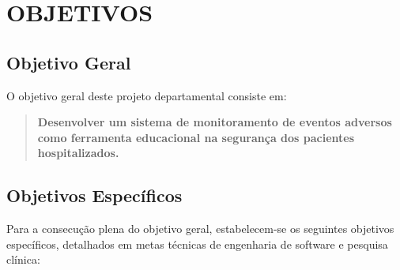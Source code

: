 \chapter{OBJETIVOS}
\label{cap:objetivos}

\section{Objetivo Geral}
\label{sec:objetivo-geral}

O objetivo geral deste projeto departamental consiste em:

\begin{quote}
\textbf{Desenvolver um sistema de monitoramento de eventos adversos como ferramenta educacional na segurança dos pacientes hospitalizados.}
\end{quote}

\section{Objetivos Específicos}
\label{sec:objetivos-especificos}

Para a consecução plena do objetivo geral, estabelecem-se os seguintes objetivos específicos, detalhados em metas técnicas de engenharia de software e pesquisa clínica:

